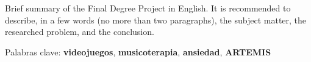 
Brief summary of the Final Degree Project in English. It is recommended to describe, in a few words (no more than two paragraphs), the subject matter, the researched problem, and the conclusion.

\noindent Palabras clave: \textbf{videojuegos}, \textbf{musicoterapia}, \textbf{ansiedad}, \textbf{ARTEMIS}